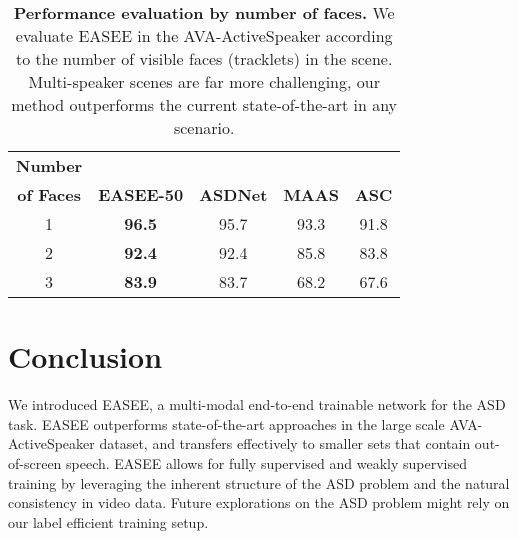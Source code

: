 \documentclass[10pt,twocolumn,letterpaper]{article}
\begin{document}
\begin{table}[h]
    \centering
    \footnotesize
    \begin{tabular}{c c c c c}
        \hline
        \textbf{Number} & & & &  \\
        \textbf{of Faces} \quad & \textbf{EASEE-50} & \textbf{ASDNet} \cite{kopuklu2021design} & \textbf{MAAS} \cite{leon2021maas}  &  \textbf{ASC} \cite{alcazar2020active} \\
        \hline 
        1 &  \textbf{96.5} & 95.7 &93.3 & 91.8 \\
        2 &  \textbf{92.4} & 92.4 & 85.8 & 83.8   \\
        3 &  \textbf{83.9} & 83.7 & 68.2 & 67.6  \\
        \hline
    \end{tabular}
    \caption{
        \textbf{Performance evaluation by number of faces.} 
        We evaluate EASEE in the AVA-ActiveSpeaker according to the number of visible faces (tracklets) in the scene. Multi-speaker scenes are far more challenging, our method outperforms the current state-of-the-art in any scenario.
    }
    \label{tab:avanumsp}
\end{table}






 

\section{Conclusion}
We introduced EASEE, a multi-modal end-to-end trainable network for the ASD task. EASEE outperforms state-of-the-art approaches in the large scale AVA-ActiveSpeaker\cite{roth2020ava} dataset, and transfers effectively to smaller sets that contain out-of-screen speech. EASEE allows for fully supervised and weakly supervised training by leveraging the inherent structure of the ASD problem and the natural consistency in video data. Future explorations on the ASD problem might rely on our label efficient training setup.


{\small


}
\end{document}
